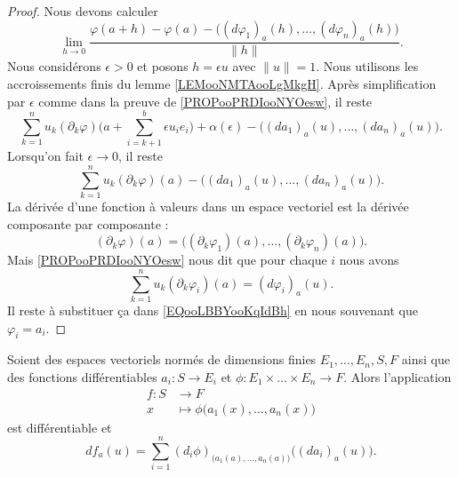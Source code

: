\begin{proof}
	Nous devons calculer
	\begin{equation}
		\lim_{h\to 0}\frac{ \varphi(a+h)-\varphi(a)-\big( (d\varphi_1)_a(h),\ldots,(d\varphi_n)_a(h) \big) }{ \| h \| }.
	\end{equation}
	Nous considérons \( \epsilon>0\) et posons \( h=\epsilon u\) avec \( \| u \|=1\). Nous utilisons les accroissements finis du lemme \ref{LEMooNMTAooLgMkgH}. Après simplification par \( \epsilon\) comme dans la preuve de \ref{PROPooPRDIooNYOesw}, il reste
	\begin{equation}
		\sum_{k=1}^nu_k(\partial_k\varphi)\big( a+\sum_{i=k+1}^b\epsilon u_ie_i \big)+\alpha(\epsilon)-\big( (da_1)_a(u),\ldots,(da_n)_a(u) \big).
	\end{equation}
	Lorsqu'on fait \( \epsilon\to 0\), il reste
	\begin{equation}		\label{EQooLBBYooKqIdBh}
		\sum_{k=1}^nu_k(\partial_k\varphi)(a)-\big( (da_1)_a(u),\ldots,(da_n)_a(u) \big).
	\end{equation}
	La dérivée d'une fonction à valeurs dans un espace vectoriel est la dérivée composante par composante :
	\begin{equation}
		(\partial_k\varphi)(a)=\big( (\partial_k\varphi_1)(a),\ldots,(\partial_k\varphi_n)(a) \big).
	\end{equation}
	Mais \ref{PROPooPRDIooNYOesw} nous dit que pour chaque \( i\) nous avons
	\begin{equation}
		\sum_{k=1}^nu_k(\partial_k\varphi_i)(a)=(d\varphi_i)_a(u).
	\end{equation}
	Il reste à substituer ça dans \eqref{EQooLBBYooKqIdBh} en nous souvenant que \( \varphi_i=a_i\).
\end{proof}

\begin{proposition}	\label{PROPooCTXUooTGJbIK}
	Soient des espaces vectoriels normés de dimensions finies \( E_1,\ldots,E_n, S, F\) ainsi que des fonctions différentiables \(a_i \colon S\to E_i  \) et \(\phi \colon E_1\times \ldots\times E_n\to F  \). Alors l'application
	\begin{equation}
		\begin{aligned}
			f\colon S & \to F                                        \\
			x         & \mapsto \phi\big( a_1(x),\ldots,a_n(x) \big)
		\end{aligned}
	\end{equation}
	est différentiable et
	\begin{equation}
		df_a(u)=\sum_{i=1}^n(d_i\phi)_{\big( a_1(a),\ldots,a_n(a) \big)}\big( (da_i)_a(u) \big).
	\end{equation}
\end{proposition}

